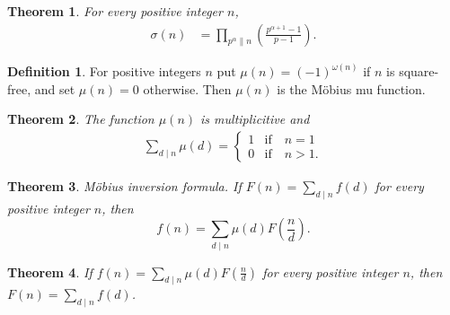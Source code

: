 \documentclass{amsart}
\newtheorem{theorem}{Theorem}
\theoremstyle{definition}
\newtheorem*{definition*}{Definition}
\begin{document}
\begin{theorem}
  For every positive integer $n$, 
  \begin{align*}
    \sigma(n) &= \prod_{p^{\alpha} \parallel n}
                \left( \frac{p^{\alpha + 1} - 1}{p -1} \right).
  \end{align*}
\end{theorem}

\begin{definition*}
  For positive integers $n$ put $\mu(n) = (-1)^{\omega(n)}$ 
  if $n$ is square-free, and set $\mu(n) = 0$ otherwise.
  Then $\mu(n)$ is the M\"{o}bius mu function.
\end{definition*}

\begin{theorem}
  The function $\mu(n)$ is multiplicitive and 
  \begin{align*}
    \sum_{d \mid n} \mu(d) =
    \begin{cases} 
      1 & \text{if} \quad n = 1 \\
      0 & \text{if} \quad n > 1.
    \end{cases}
  \end{align*}
\end{theorem}

\begin{theorem}
  M\"{o}bius inversion formula.
  If $F(n) = \sum_{d \mid n} f(d)$ for every positive integer $n$,
  then 
  \[
    f(n) = \sum_{d \mid n} \mu(d) F\left( \frac{n}{d} \right).
  \]
\end{theorem}

\begin{theorem}
  If $f(n) = \sum_{d \mid n} \mu(d) F\left( \frac{n}{d} \right)$ for
  every positive integer $n$, then $F(n) = \sum_{d \mid n} f(d)$.
\end{theorem}
\end{document}

